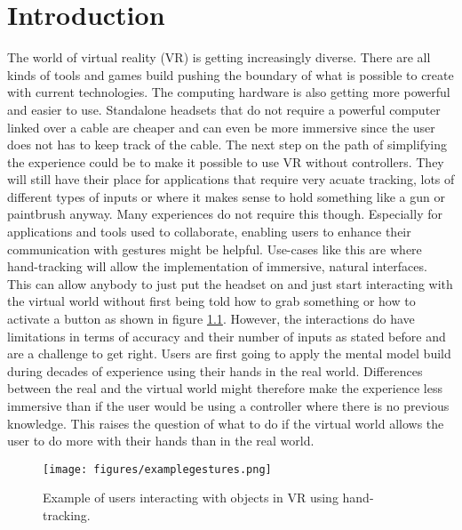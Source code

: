 
\chapter{Introduction}
The world of virtual reality (VR) is getting increasingly diverse. There are all kinds of tools and games build pushing the boundary of what is possible to create with current technologies. The computing hardware is also getting more powerful and easier to use. Standalone headsets that do not require a powerful computer linked over a cable are cheaper and can even be more immersive since the user does not has to keep track of the cable. The next step on the path of simplifying the experience could be to make it possible to use VR without controllers. They will still have their place for applications that require very acuate tracking, lots of different types of inputs or where it makes sense to hold something like a gun or paintbrush anyway. Many experiences do not require this though. Especially for applications and tools used to collaborate, enabling users to enhance their communication with gestures might be helpful. Use-cases like this are where hand-tracking will allow the implementation of immersive, natural interfaces. This can allow anybody to just put the headset on and just start interacting with the virtual world without first being told how to grab something or how to activate a button as shown in figure \ref{fig:example}. However, the interactions do have limitations in terms of accuracy and their number of inputs as stated before and are a challenge to get right. Users are first going to apply the mental model build during decades of experience using their hands in the real world. Differences between the real and the virtual world might therefore make the experience less immersive than if the user would be using a controller where there is no previous knowledge. This raises the question of what to do if the virtual world allows the user to do more with their hands than in the real world. 

\begin{figure}[!ht]
    \centering
    \texttt{[image: figures/examplegestures.png]}
    \caption{Example of users interacting with objects in VR using hand-tracking. \cite{Han}}
    \label{fig:example}
\end{figure}


